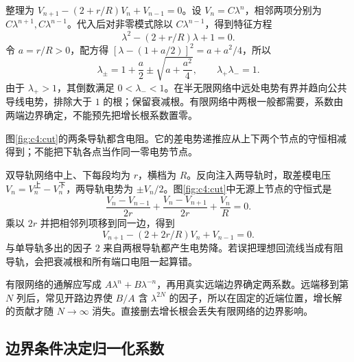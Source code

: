 整理为 $V_{n+1}-(2+r/R)V_n+V_{n-1}=0$。设 $V_n=C\lambda^n$，相邻两项分别为 $C\lambda^{n+1},C\lambda^{n-1}$。代入后对非零模式除以 $C\lambda^{n-1}$，得到特征方程
\[
 \lambda^2-(2+r/R)\lambda+1=0.
\]
令 $a=r/R>0$，配方得 $[\lambda-(1+a/2)]^2=a+a^2/4$，所以
\[
 \lambda_\pm=1+\frac a2\pm\sqrt{a+\frac{a^2}{4}},
 \qquad \lambda_+\lambda_-=1.
\]
由于 $\lambda_+>1$，其倒数满足 $0<\lambda_-<1$。在半无限网络中远处电势有界并趋向公共导线电势，排除大于 $1$ 的根；保留衰减根。有限网络中两根一般都需要，系数由两端边界确定，不能预先把增长根系数置零。

图\ref{fig:c4:cut}的两条导轨都含电阻。它的差电势递推应从上下两个节点的守恒相减得到；不能把下轨各点当作同一零电势节点。

双导轨网络中上、下每段均为 $r$，横档为 $R$。反向注入两导轨时，取差模电压 $V_n=V_n^{\text{上}}-V_n^{\text{下}}$，两导轨电势为 $\pm V_n/2$。图\ref{fig:c4:cut}中无源上节点的守恒式是
\[
 \frac{V_n-V_{n-1}}{2r}+\frac{V_n-V_{n+1}}{2r}+\frac{V_n}{R}=0.
\]
乘以 $2r$ 并把相邻列项移到同一边，得到
\[
 V_{n+1}-(2+2r/R)V_n+V_{n-1}=0.
\]
与单导轨多出的因子 $2$ 来自两根导轨都产生电势降。若误把理想回流线当成有阻导轨，会把衰减根和所有端口电阻一起算错。


有限网络的通解应写成 $A\lambda^n+B\lambda^{-n}$，再用真实远端边界确定两系数。远端移到第 $N$ 列后，常见开路边界使 $B/A$ 含 $\lambda^{2N}$ 的因子，所以在固定的近端位置，增长解的贡献才随 $N\to\infty$ 消失。直接删去增长根会丢失有限网络的边界影响。


\subsection{边界条件决定归一化系数}

